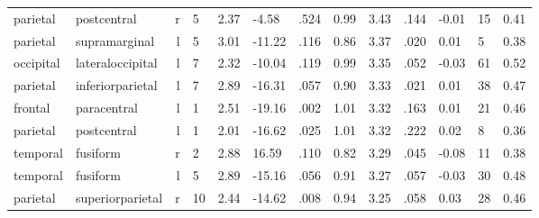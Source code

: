 \documentclass{article}
\begin{document}
\begin{longtable}{llrR{1.3cm}R{1cm}R{1.3cm}R{1cm}R{1cm}R{1.3cm}R{1cm}R{1.8cm}R{1.3cm}R{1.8cm}}
  parietal &               postcentral &    r &         5 &                  2.37 &            -4.58 &               .524 &                               0.99 &                          3.43 &                            .144 &  -0.01 &     15 &      0.41 \\
  parietal &             supramarginal &    l &         5 &                  3.01 &           -11.22 &               .116 &                               0.86 &                          3.37 &                            .020 &   0.01 &      5 &      0.38 \\
 occipital &          lateraloccipital &    l &         7 &                  2.32 &           -10.04 &               .119 &                               0.99 &                          3.35 &                            .052 &  -0.03 &     61 &      0.52 \\
  parietal &          inferiorparietal &    l &         7 &                  2.89 &           -16.31 &               .057 &                               0.90 &                          3.33 &                            .021 &   0.01 &     38 &      0.47 \\
   frontal &               paracentral &    l &         1 &                  2.51 &           -19.16 &               .002 &                               1.01 &                          3.32 &                            .163 &   0.01 &     21 &      0.46 \\
  parietal &               postcentral &    l &         1 &                  2.01 &           -16.62 &               .025 &                               1.01 &                          3.32 &                            .222 &   0.02 &      8 &      0.36 \\
  temporal &                  fusiform &    r &         2 &                  2.88 &            16.59 &               .110 &                               0.82 &                          3.29 &                            .045 &  -0.08 &     11 &      0.38 \\
  temporal &                  fusiform &    l &         5 &                  2.89 &           -15.16 &               .056 &                               0.91 &                          3.27 &                            .057 &  -0.03 &     30 &      0.48 \\
  parietal &          superiorparietal &    r &        10 &                  2.44 &           -14.62 &               .008 &                               0.94 &                          3.25 &                            .058 &   0.03 &     28 &      0.46 \\

\end{longtable}
\end{document}
